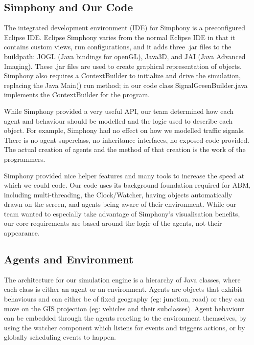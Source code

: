 \documentclass[11pt]{article}
\begin{document}
\subsection{Simphony and Our Code}

The integrated development environment (IDE) for Simphony is a preconfigured Eclipse IDE. Eclipse Simphony varies from the normal Eclipse IDE in that it contains custom views, run configurations, and it adds three .jar files to the buildpath: JOGL (Java bindings for openGL), Java3D, and JAI (Java Advanced Imaging). These .jar files are used to create graphical representation of objects. Simphony also requires a ContextBuilder to initialize and drive the simulation, replacing the Java Main() run method; in our code class SignalGreenBuilder.java implements the ContextBuilder for the program.

While Simphony provided a very useful API, our team determined how each agent and behaviour should be modelled and the logic used to describe each object. For example, Simphony had no effect on how we modelled traffic signals. There is no agent superclass, no inheritance interfaces, no exposed code provided. The actual creation of agents and the method of that creation is the work of the programmers. 

Simphony provided nice helper features and many tools to increase the speed at which we could code. Our code uses its background foundation required for ABM, including multi-threading, the Clock/Watcher, having objects automatically drawn on the screen, and agents being aware of their environment. While our team wanted to especially take advantage of Simphony\textquoteright s visualisation benefits, our core requirements are based around the logic of the agents, not their appearance.


\subsection{Agents and Environment}


The architecture for our simulation engine is a hierarchy of Java classes, where each class is either an agent or an environment. Agents are objects that exhibit behaviours and can either be of fixed geography (eg: junction, road) or they can move on the GIS projection (eg: vehicles and their subclasses). Agent behaviour can be embedded through the agents reacting to the environment themselves, by using the watcher component which listens for events and triggers actions, or by globally scheduling events to happen.
\end{document}
